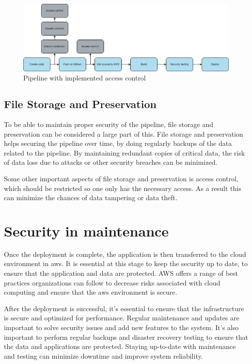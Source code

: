 \vspace{2mm}
\begin{figure}[H]
    \centering
    \includegraphics[width=0.8\columnwidth]{Images/pipeline7.png}
    \caption{Pipeline with implemented access control}
    \label{fig: Pipeline with implemented access control}
\end{figure}
 
\subsection{File Storage and Preservation}
To be able to maintain proper security of the pipeline, file storage and preservation can be considered a large part of this. File storage and preservation helps securing the pipeline over time, by doing regularly backups of the data related to the pipeline. By maintaining redundant copies of critical data, the risk of data loss due to attacks or other security breaches can be minimized. 

Some other important aspects of file storage and preservation is access control, which should be restricted so one only has the necessary access. As a result this can minimize the chances of data tampering or data theft.

\section{Security in maintenance}
Once the deployment is complete, the application is then transferred to the cloud environment in \acrlong{aws}. It is essential at this stage to keep the security up to date, to ensure that the application and data are protected. AWS offers a range of best practices organizations can follow to decrease risks associated with cloud computing and ensure that the  \acrshort{aws} environment is secure.

After the deployment is successful, it's essential to ensure that the infrastructure is secure and optimized for performance. Regular maintenance and updates are important to solve security issues and add new features to the system. It's also important to perform regular backups and disaster recovery testing to ensure that the data and applications are protected. 
Staying up-to-date with maintenance and testing can minimize downtime and improve system reliability. 

